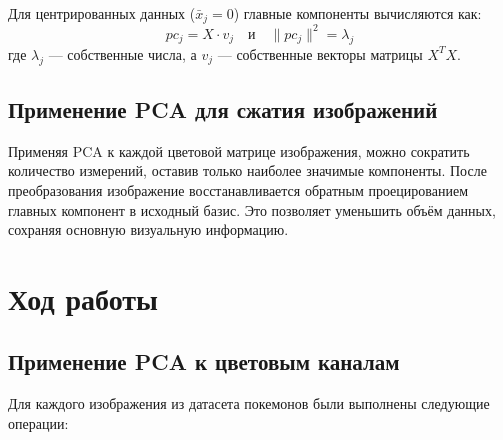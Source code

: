 \documentclass[14pt]{extarticle}
\begin{document}
Для центрированных данных ($\bar{x}_j = 0$) главные компоненты вычисляются как:
\begin{equation*}
pc_j = X \cdot v_j \quad \text{и} \quad \|pc_j\|^2 = \lambda_j
\end{equation*}
где $\lambda_j$ — собственные числа, а $v_j$ — собственные векторы матрицы $X^T X$.

\subsection{Применение PCA для сжатия изображений}
Применяя PCA к каждой цветовой матрице изображения, можно сократить количество измерений, оставив только наиболее значимые компоненты. После преобразования изображение восстанавливается обратным проецированием главных компонент в исходный базис. Это позволяет уменьшить объём данных, сохраняя основную визуальную информацию.

\section{Ход работы}

\subsection{Применение PCA к цветовым каналам}
Для каждого изображения из датасета покемонов были выполнены следующие операции:
\end{document}
